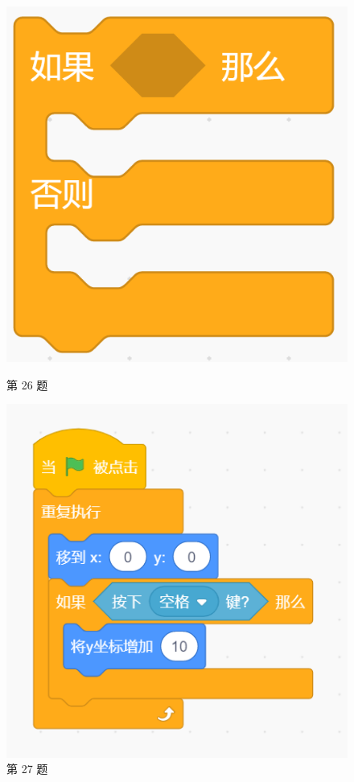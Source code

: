 \documentclass[10pt, a4paper]{article}
\begin{document}
\begin{figure}[htbp]
\begin{minipage}[t]{.29\textwidth}
\begin{minipage}[t]{.45\textwidth}
            \end{minipage}
            \begin{minipage}[t]{.53\textwidth}
                \centering
                \includegraphics[width=\textwidth]{26-2.png}
            \end{minipage}
            \caption*{第 26 题}
        \end{minipage}
        \begin{minipage}[t]{.23\textwidth}
            \centering
            \includegraphics[width=\textwidth]{27.png}
            \caption*{第 27 题}
        \end{minipage}
    \end{figure}
\end{document}
